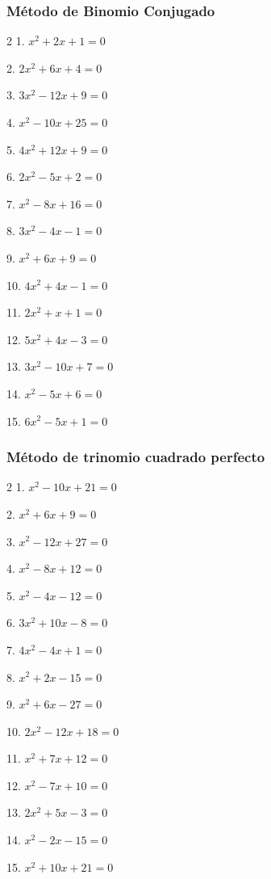 \documentclass[12pt]{article}
\begin{document}
\subsubsection{Método de Binomio
Conjugado}\label{muxe9todo-de-binomio-conjugado}
\begin{multicols}{2}
1. $x^2 + 2x + 1 = 0$

2. $2x^2 + 6x + 4 = 0$

3. $3x^2 - 12x + 9 = 0$

4. $x^2 - 10x + 25 = 0$

5. $4x^2 + 12x + 9 = 0$

6. $2x^2 - 5x + 2 = 0$

7. $x^2 - 8x + 16 = 0$

8. $3x^2 - 4x - 1 = 0$

9. $x^2 + 6x + 9 = 0$

10. $4x^2 + 4x - 1 = 0$

11. $2x^2 + x + 1 = 0$

12. $5x^2 + 4x - 3 = 0$

13. $3x^2 - 10x + 7 = 0$

14. $x^2 - 5x + 6 = 0$

15. $6x^2 - 5x + 1 = 0$
\end{multicols}

\subsubsection{Método de trinomio cuadrado
perfecto}\label{muxe9todo-de-trinomio-cuadrado-perfecto}
\begin{multicols}{2}
1. $x^2 - 10x + 21 = 0$

2. $x^2 + 6x + 9 = 0$

3. $x^2 - 12x + 27 = 0$

4. $x^2 - 8x + 12 = 0$

5. $x^2 - 4x - 12 = 0$

6. $3x^2 + 10x - 8 = 0$

7. $4x^2 - 4x + 1 = 0$

8. $x^2 + 2x - 15 = 0$

9. $x^2 + 6x - 27 = 0$

10. $2x^2 - 12x + 18 = 0$

11. $x^2 + 7x + 12 = 0$

12. $x^2 - 7x + 10 = 0$

13. $2x^2 + 5x - 3 = 0$

14. $x^2 - 2x - 15 = 0$

15. $x^2 + 10x + 21 = 0$
\end{multicols}
\end{document}
